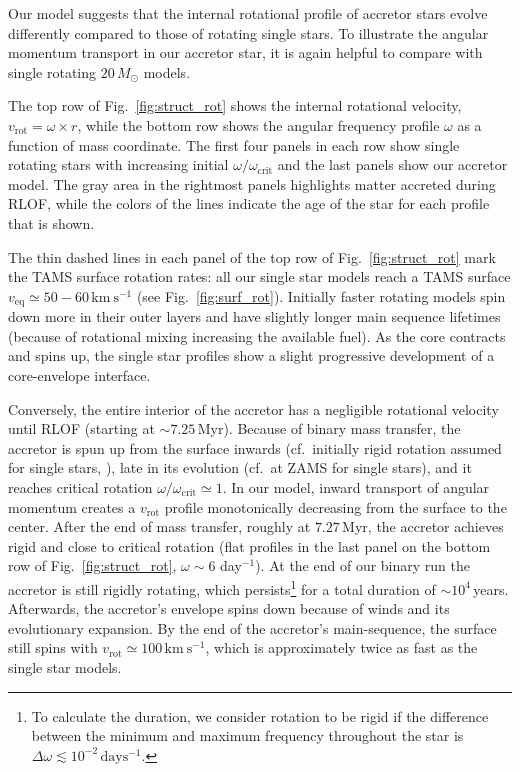 \documentclass[twocolumn,twocolappendix,trackchanges]{aastex63}
\newcommand{\kms}{{\mathrm{km\ s^{-1}}}}
\DeclareRobustCommand{\Figref}[1]{Fig.~\ref{#1}}
\begin{document}
Our model suggests that the internal rotational profile of accretor
stars evolve differently compared to those of rotating single stars.
To illustrate the angular momentum transport in our accretor star, it
is again helpful to compare with single rotating $20\,M_\odot$
models.


The top row of \Figref{fig:struct_rot} shows the internal rotational
velocity, $v_\mathrm{rot}=\omega\times r$, while the bottom row shows
the angular frequency profile $\omega$ as a function of mass
coordinate. The first four panels in each row show single rotating
stars with increasing initial $\omega/\omega_\mathrm{crit}$ and the last
panels show our accretor model. The gray area in the rightmost
panels highlights matter accreted during RLOF, while the colors of the
lines indicate the age of the star for each profile that is shown.

The thin dashed lines in each panel of the top row of
\Figref{fig:struct_rot} mark the TAMS surface rotation rates: all our
single star models reach a TAMS surface
$v_\mathrm{eq}\simeq50-60\,\kms$ (see \Figref{fig:surf_rot}). Initially faster rotating models
spin down more in their outer layers and have slightly longer main
sequence lifetimes (because of rotational mixing increasing the
available fuel). As the
core contracts and spins up, the single star profiles show a slight
progressive development of a core-envelope interface.

Conversely, the entire interior of the accretor has a negligible
rotational velocity until RLOF (starting at
$\sim{}7.25$\,Myr). Because of binary mass transfer, the accretor is
spun up from the surface inwards (cf.\ initially rigid rotation assumed
for single stars, \citealt{maeder:00}), late in its evolution (cf.\
at ZAMS for single stars), and it
reaches critical rotation $\omega/\omega_\mathrm{crit}\simeq1$. In our
model, inward transport of angular momentum creates a $v_\mathrm{rot}$
profile monotonically decreasing from the surface to the center. After
the end of mass transfer, roughly at $7.27$\,Myr, the accretor
achieves rigid and close to critical rotation (flat profiles in the
last panel on the bottom row of \Figref{fig:struct_rot},
$\omega \sim 6$ day$^{-1}$). At the end of our binary run the
accretor is still rigidly rotating, which persists\footnote{To calculate
  the duration, we consider rotation to be rigid if the difference
  between the minimum and maximum frequency throughout the star is
  $\Delta \omega \lesssim 10^{-2}\,\mathrm{days^{-1}}$.} for a total
duration of $\sim10^{4}$\,years. Afterwards, the accretor's envelope
spins down because of winds and its evolutionary expansion.  By the
end of the accretor's main-sequence, the surface still spins with
$v_\mathrm{rot}\simeq100\,\kms$, which is approximately twice as fast
as the single star models.
\end{document}
